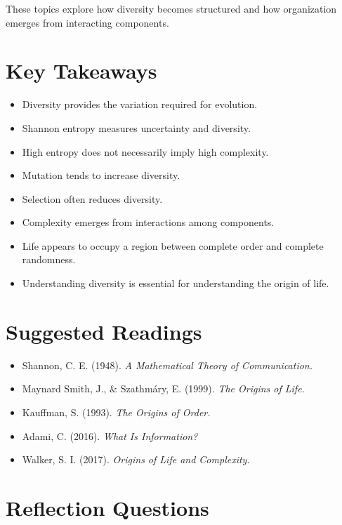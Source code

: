 \documentclass[
  oneside,
  openany]{book}
\providecommand{\tightlist}{%
  \setlength{\itemsep}{0pt}\setlength{\parskip}{0pt}}
\begin{document}
These topics explore how diversity becomes structured and how organization emerges from interacting components.

\section{Key Takeaways}\label{key-takeaways-1}

\begin{itemize}
\tightlist
\item
  Diversity provides the variation required for evolution.
\item
  Shannon entropy measures uncertainty and diversity.
\item
  High entropy does not necessarily imply high complexity.
\item
  Mutation tends to increase diversity.
\item
  Selection often reduces diversity.
\item
  Complexity emerges from interactions among components.
\item
  Life appears to occupy a region between complete order and complete randomness.
\item
  Understanding diversity is essential for understanding the origin of life.
\end{itemize}

\section{Suggested Readings}\label{suggested-readings-1}

\begin{itemize}
\tightlist
\item
  Shannon, C. E. (1948). \emph{A Mathematical Theory of Communication.}
\item
  Maynard Smith, J., \& Szathmáry, E. (1999). \emph{The Origins of Life.}
\item
  Kauffman, S. (1993). \emph{The Origins of Order.}
\item
  Adami, C. (2016). \emph{What Is Information?}
\item
  Walker, S. I. (2017). \emph{Origins of Life and Complexity.}
\end{itemize}

\section{Reflection Questions}\label{reflection-questions-3}
\end{document}
